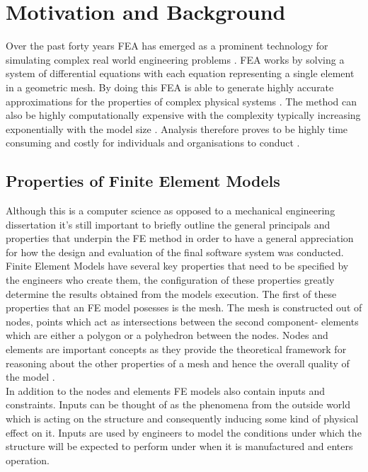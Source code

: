 
\section{Motivation and Background}
Over the past forty years FEA has emerged as a prominent technology for simulating complex real world engineering problems \cite{cite0, DolsakPaper94}. FEA works by solving a system of differential equations with each equation representing a single element in a geometric mesh. By doing this FEA is able to generate highly accurate approximations for the properties of complex physical systems \cite{DolsakPaper94} \cite{IntroductionToFE}. The method can also be highly computationally expensive with the complexity typically increasing exponentially with the model size \cite{DolsakPaper94}. Analysis therefore proves to be highly time consuming and costly for individuals and organisations to conduct \cite{ConsultRuleIntelltSystemFE}. \cite{cite03}\\


\subsection{Properties of Finite Element Models}
Although this is a computer science as opposed to a mechanical engineering dissertation it's still important to briefly outline the general principals and properties that underpin the FE method in order to have a general appreciation for how the design and evaluation of the final software system was conducted. \\ 

\noindent
Finite Element Models have several key properties that need to be specified by the engineers who create them, the configuration of these properties greatly determine the results obtained from the models execution. The first of these properties that an FE model posesses is the mesh. The mesh is constructed out of nodes, points which act as intersections between the second component- elements which are either a polygon or a polyhedron between the nodes. Nodes and elements are important concepts as they provide the theoretical framework for reasoning about the other properties of a mesh and hence the overall quality of the model \cite{IntroductionToFE}.\\ 

\noindent
In addition to the nodes and elements FE models also contain inputs and constraints. Inputs can be thought of as the phenomena from the outside world which is acting on the structure and consequently inducing some kind of physical effect on it. Inputs are used by engineers to model the conditions under which the structure will be expected to perform under when it is manufactured and enters operation. \\

